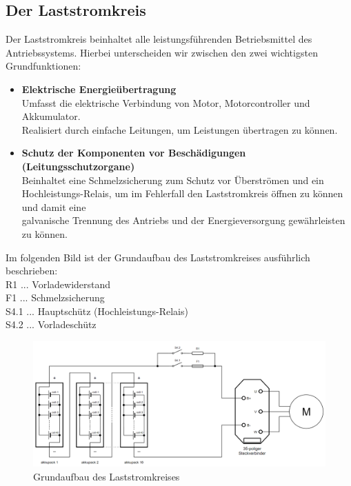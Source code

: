 \subsection{Der Laststromkreis}
Der Laststromkreis beinhaltet alle leistungsführenden Betriebsmittel des Antriebssystems. Hierbei unterscheiden wir zwischen den zwei wichtigsten Grundfunktionen:
\\[5mm]
\begin{itemize}
	\item \textbf{Elektrische Energieübertragung}
	\\ \medskip Umfasst die elektrische Verbindung von Motor, Motorcontroller und Akkumulator. 			\\ Realisiert durch einfache Leitungen, um Leistungen übertragen zu können.
	\medskip
	\item \textbf{Schutz der Komponenten vor Beschädigungen (Leitungsschutzorgane)}
	\\ \medskip Beinhaltet eine Schmelzsicherung zum Schutz vor Überströmen und ein 					\\ Hochleistungs-Relais, um im Fehlerfall den Laststromkreis öffnen zu können und damit eine  		
	\\ galvanische Trennung des Antriebs und der Energieversorgung gewährleisten zu können.
\end{itemize}
\vspace{5mm}

Im folgenden Bild ist der Grundaufbau des Laststromkreises ausführlich beschrieben:
\vspace{2mm}
\\R1 ... Vorladewiderstand
\\F1 ... Schmelzsicherung
\\S4.1 ... Hauptschütz (Hochleistungs-Relais)
\\S4.2 ... Vorladeschütz
\vspace{5mm}
\begin{figure}[H]
	\begin{center}
		\includegraphics[scale=0.5]{figures/Antrieb/Antrieb_Laststromkreis.png}
		\caption{Grundaufbau des Laststromkreises}
	\end{center}
\end{figure}

